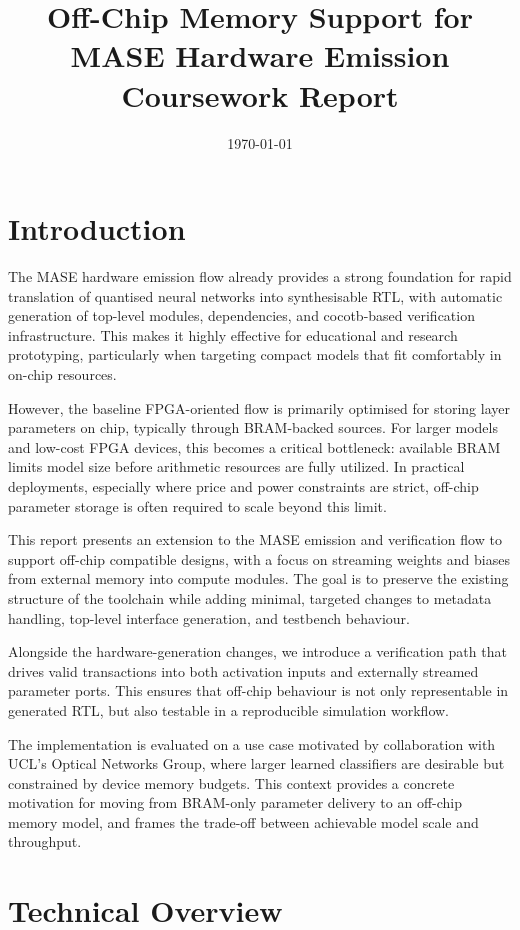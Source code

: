 \documentclass[11pt,a4paper]{article}
\title{Off-Chip Memory Support for MASE Hardware Emission\\
\large Coursework Report}
\author{}
\date{\today}
\begin{document}
\maketitle

\section{Introduction}

The MASE hardware emission flow already provides a strong foundation for rapid
translation of quantised neural networks into synthesisable RTL, with automatic
generation of top-level modules, dependencies, and cocotb-based verification
infrastructure. This makes it highly effective for educational and research
prototyping, particularly when targeting compact models that fit comfortably in
on-chip resources.

However, the baseline FPGA-oriented flow is primarily optimised for storing
layer parameters on chip, typically through BRAM-backed sources. For larger
models and low-cost FPGA devices, this becomes a critical bottleneck: available
BRAM limits model size before arithmetic resources are fully utilized. In
practical deployments, especially where price and power constraints are strict,
off-chip parameter storage is often required to scale beyond this limit.

This report presents an extension to the MASE emission and verification flow to
support off-chip compatible designs, with a focus on streaming weights and
biases from external memory into compute modules. The goal is to preserve the
existing structure of the toolchain while adding minimal, targeted changes to
metadata handling, top-level interface generation, and testbench behaviour.

Alongside the hardware-generation changes, we introduce a verification path that
drives valid transactions into both activation inputs and externally streamed
parameter ports. This ensures that off-chip behaviour is not only representable
in generated RTL, but also testable in a reproducible simulation workflow.

The implementation is evaluated on a use case motivated by collaboration with
UCL's Optical Networks Group, where larger learned classifiers are desirable
but constrained by device memory budgets. This context provides a concrete
motivation for moving from BRAM-only parameter delivery to an off-chip memory
model, and frames the trade-off between achievable model scale and throughput.

\section{Technical Overview}
\end{document}
